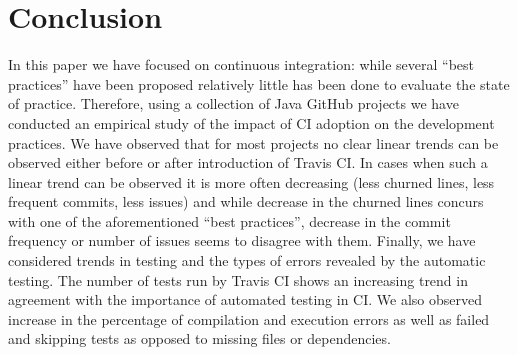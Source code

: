 \section{Conclusion}
\label{sec:conc}
In this paper we have focused on continuous integration: while several ``best practices'' have been proposed relatively little has been done to evaluate the state of practice.
Therefore, using a collection of Java GitHub projects we have conducted an empirical study of the impact of CI adoption on the development practices.
We have observed that for most projects no clear linear trends can be observed either before or after introduction of Travis CI.
In cases when such a linear trend can be observed it is more often decreasing (less churned lines, less frequent commits, less issues) and while
decrease in the churned lines concurs with one of the aforementioned ``best practices'', decrease in the commit frequency or number of issues
seems to disagree with them. 
Finally, we have considered trends in testing and the types of errors revealed by the automatic testing.
The number of tests run by Travis CI shows an increasing trend  
in agreement with the importance of automated testing in CI.
We also observed increase in the percentage of compilation and execution errors as well as failed and skipping tests as opposed to missing files or dependencies.

